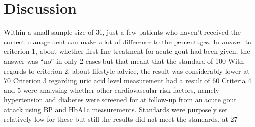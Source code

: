 \documentclass[paper=a4,fontsize=11pt,twocolumn]{article}
\begin{document}
\section{Discussion}
Within a small sample size of 30, just a few patients who haven’t received the correct management can make a lot of difference to the percentages. In answer to criterion 1, about whether first line treatment for acute gout had been given, the answer was “no” in only 2 cases but that meant that the standard of 100%
With regards to criterion 2, about lifestyle advice, the result was considerably lower at 70%
Criterion 3 regarding uric acid level measurement had a result of 60%
Criteria 4 and 5 were analysing whether other cardiovascular risk factors, namely hypertension and diabetes were screened for at follow-up from an acute gout attack using BP and HbA1c measurements. Standards were purposely set relatively low for these but still the results did not meet the standards, at 27%
\end{document}
